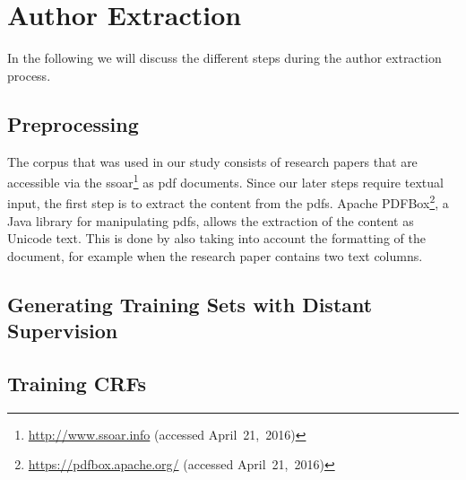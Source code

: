 \chapter{Author Extraction}\label{cha:author-extraction}

In the following we will discuss the different steps during the author extraction process.

\section{Preprocessing}\label{sec:ae-preprocessing}

The corpus that was used in our study consists of  research papers that are accessible via the \gls{ssoar}\footnote{\url{http://www.ssoar.info} (accessed April~21,~2016)} as \gls{pdf} documents.
Since our later steps require textual input, the first step is to extract the content from the \glspl{pdf}.
Apache PDFBox\footnote{\url{https://pdfbox.apache.org/} (accessed April~21,~2016)}, a Java library for manipulating \glspl{pdf}, allows the extraction of the content as Unicode text.
This is done by also taking into account the formatting of the document, for example when the research paper contains two text columns.

\section{Generating Training Sets with Distant Supervision}\label{sec:ae-distant-supervision}


\section{Training CRFs}\label{sec:ae-training-crfs}

